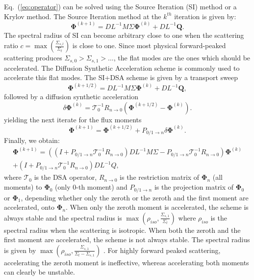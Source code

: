 \documentclass[preprint,10pt]{elsarticle}
\newcommand\bs{\boldsymbol}
\renewcommand{\(}{\left(}
\renewcommand{\)}{\right)}
\renewcommand{\[}{\left[}
\renewcommand{\]}{\right]}
\newcommand{\eqt}[1]{Eq.~(\ref{#1})}                     %
\begin{document}
\eqt{eq:operator} can be solved using the Source Iteration (SI) method or a
Krylov method. The Source Iteration method at the $k^{th}$ iteration is given
by:
%
\begin{equation}
\bs{\Phi}^{(k+1)} = DL^{-1}M\Sigma \bs{\Phi}^{(k)} + DL^{-1}\bs{Q} .
\end{equation}
%
The spectral radius of SI can become arbitrary close to one when the
scattering ratio $c=\max\(\frac{\Sigma_{s,l}}{\Sigma_t}\)$ is close to one.
Since most physical forward-peaked scattering produces
$\Sigma_{s,0}>\Sigma_{s,1}>\hdots$, the flat modes are the ones which should
be accelerated. The Diffusion Synthetic Acceleration scheme \cite{adams} is
commonly used to accelerate this flat modes. The SI+DSA scheme is given by
%
a transport sweep
\begin{equation}
\bs{\Phi}^{(k+1/2)} = DL^{-1}M\Sigma\bs{\Phi}^{(k)} + DL^{-1}\bs{Q},
\end{equation}
%
followed by a diffusion synthetic acceleration
%
\begin{equation}
\delta\bs{\Phi}^{(k)} = \mathcal{T}_0^{-1} R_{n\rightarrow 0} 
\(\bs{\Phi}^{(k+1/2)}-\bs{\Phi}^{(k)}\) .
\end{equation}
%
yielding the next iterate for the flux moments
%
\begin{equation}
\bs{\Phi}^{(k+1)} = \bs{\Phi}^{(k+1/2)} + P_{0/1 \rightarrow n} \delta 
\bs{\Phi}^{(k)} .
\end{equation}
%
Finally, we obtain:
%
\begin{multline}
\bs{\Phi}^{(k+1)} = \((I+P_{0/1\rightarrow n} \mathcal{T}_0^{-1} R_{n\rightarrow 0} )
DL^{-1}M\Sigma-P_{0/1\rightarrow n}\mathcal{T}_0^{-1} R_{n\rightarrow 0}\)
\bs{\Phi}^{(k)}\\ + (I+P_{0/1\rightarrow n}\mathcal{T}_0^{-1}
R_{n\rightarrow 0})DL^{-1} Q ,
\end{multline}
%
where $\mathcal{T}_0$ is the DSA operator, $R_{n\rightarrow 0}$ is the
restriction matrix of $\bs{\Phi}_{n}$ (all moments) to $\bs{\Phi}_0$ (only 0-th moment) and $P_{0/1 \rightarrow
n}$ is the projection matrix of $\bs{\Phi}_0$ or $\bs{\Phi}_1$, depending
whether only the zeroth or the zeroth and the first moment are accelerated, onto
$\bs{\Phi}_n$. When only the zeroth moment is accelerated, the scheme is always
stable and the spectral radius is
$\max\(\rho_{iso},\frac{\Sigma_{s,1}}{\Sigma_t}\)$ where $\rho_{iso}$ is the
spectral radius when the scattering is isotropic. When both the zeroth and the
first moment are accelerated, the scheme is not always stable. The spectral
radius is given by
$\max\(\rho_{iso},\frac{\Sigma_{s,1}}{\Sigma_t-\Sigma_{s,1}}\)$
\cite{multisweep}. For highly forward peaked scattering, accelerating the zeroth moment 
is ineffective, whereas accelerating both moments can clearly be unstable.
\end{document}
